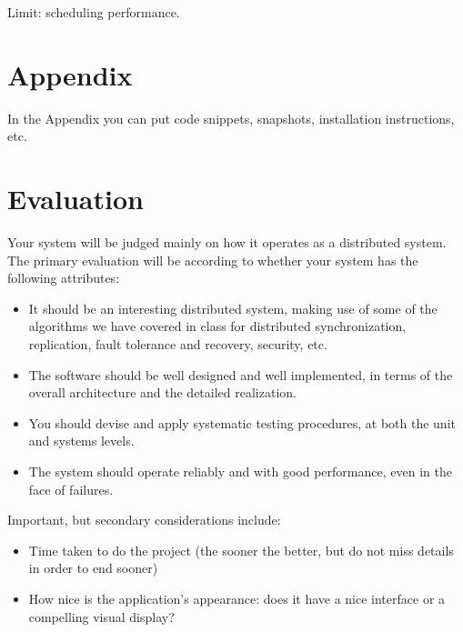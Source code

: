 \documentclass[a4paper, oneside]{memoir}
\begin{document}
Limit: scheduling performance.
\appendix

\chapter{Appendix}

In the Appendix you can put code snippets, snapshots, installation instructions, etc.


\chapter*{Evaluation}
Your system will be judged mainly on how it operates as a distributed system. The primary evaluation will be according to whether your system has the following attributes:
\begin{itemize}
\item  It should be an interesting distributed system, making use of some of the algorithms we have covered in class for distributed synchronization, replication, fault tolerance and recovery, security, etc.
\item The software should be well designed and well implemented, in terms of the overall architecture and the detailed realization.
\item You should devise and apply systematic testing procedures, at both the unit and systems levels.
\item The system should operate reliably and with good performance, even in the face of failures.
\end{itemize}
Important, but secondary considerations include:
\begin{itemize}
\item Time taken to do the project (the sooner the better, but do not miss details in order to end sooner)
\item  How nice is the application's appearance: does it have a nice interface or a compelling visual display?
\end{itemize}
\end{document}
